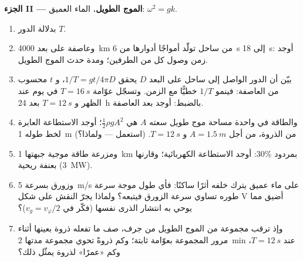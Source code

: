 \begin{problem}
\medskip
\noindent\textbf{الجزء II --- الموج الطويل.}
الماء العميق: $\omega^2 = gk$.
\begin{enumerate}[resume]
  \item {}  بدلالة الدور $T$.
  \item وعاصفة على بعد \qty{4000}{km} من ساحل تولّد أمواجًا أدوارها
        من \qty{6}{s} إلى \qty{18}{s}: أوجد زمن وصول كل من الطرفين؛
        ومدة حدث الموج الطويل.
  \item بيّن أن الدور الواصل إلى ساحل على البعد $D$ يحقق
        $1/T = gt/4\pi D$، و $t$ محسوب من العاصفة: فينمو $1/T$
        خطيًّا مع الزمن. وتسجّل عوّامة $T = \qty{16}{s}$ في يوم عند الظهر
        و $T = \qty{12}{s}$ بعد \qty{24}{h} بالضبط: أوجد بعد
        العاصفة.
  \item والطاقة في واحدة مساحة موج طويل سعته $A$ هي $\tfrac12\rho
        gA^2$؛ أوجد الاستطاعة العابرة لخط طوله \qty{1}{m} من الذروة، من أجل $A =
        \qty{1.5}{m}$ و $T = \qty{12}{s}$. (استعمل  --- ولماذا؟)
  \item ومزرعة طاقة موجية جبهتها \qty{1}{km} بمردود $30\%$:
        أوجد الاستطاعة الكهربائية؛ وقارنها بعنفة ريحية (\qty{3}{MW}).
  \item وزورق بسرعة \qty{5}{m/s} على ماء عميق يترك خلفه أثرًا ساكنًا:
        فأي طول موجة سرعة طوره تساوي سرعة الزورق
        فيتبعه؟ ولماذا يجرّ النقش على شكل V أضيق مما
        يوحي به انتشار الذرى نفسها
        (فكّر في $v_g = v_\varphi/2$)؟
  \item وإذ ترقب مجموعة من الموج الطويل من جرف، صف ما تفعله
        ذروة بعينها أثناء مرور المجموعة بعوّامة
        ثابتة؛ وكم ذروةً تحوي مجموعة مدتها
        \qty{2}{min} عند $T = \qty{12}{s}$، وكم «عمرًا» لذروة يمثّل ذلك؟
\end{enumerate}


\end{problem}
